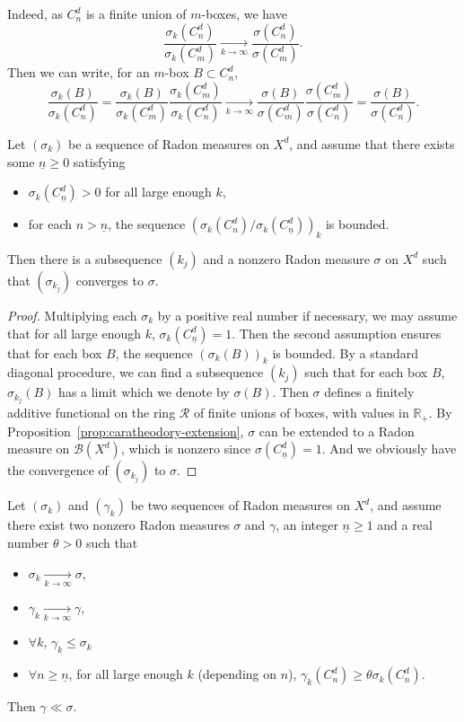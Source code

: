 \documentclass[10pt]{amsart}
\theoremstyle{definition}\newtheorem{defi}[theo]{Definition}\newtheorem{rema}[theo]{Remark}\newtheorem{exam}[theo]{Example}\newtheorem{exem}[theo]{Example}\newtheorem{nota}[theo]{Notation}
\newcommand{\tend}[3][]{\xrightarrow[#2\to#3]{#1}}
\newcommand{\RR}{\mathbb{R}}
\newcommand{\B}{\mathscr{B}}
\newcommand{\cd}{C^{d}}
\let\oldforall\forall
\renewcommand*{\forall}{\mathrel{\oldforall}}
\begin{document}
Indeed, as $\cd_n$ is a finite union of $m$-boxes, we have
\[
\frac{\sigma_k(\cd_n)}{\sigma_k(\cd_m)} \tend{k}{\infty}
\frac{\sigma(\cd_n)}{\sigma(\cd_m)}.
\]
Then we can write, for an $m$-box $B\subset\cd_n$,
\[
\frac{\sigma_k(B)}{\sigma_k(\cd_n)} = \frac{\sigma_k(B)}{\sigma_k(\cd_m)}
\frac{\sigma_k(\cd_m)}{\sigma_k(\cd_n)}
\tend{k}{\infty} \frac{\sigma(B)}{\sigma(\cd_m)}
\frac{\sigma(\cd_m)}{\sigma(\cd_n)} = \frac{\sigma(B)}{\sigma(\cd_n)}.
\]

\begin{prop}\label{prop:compacity}
Let $(\sigma_k)$ be a sequence of Radon measures on $X^d$, and assume that there exists some $\underline{n}\ge 0$ satisfying
\begin{itemize}
\item $\sigma_k(\cd_{\underline{n}})>0$ for all large enough $k$,
\item for each $n>\underline{n}$, the sequence $\left(\sigma_k(\cd_n)/\sigma_k(\cd_{\underline{n}})\right)_{k}$ is bounded.
\end{itemize}
Then there is a subsequence $(k_j)$ and a nonzero Radon measure $\sigma$ on $X^d$ such that $(\sigma_{k_j})$ converges to $\sigma$.
\end{prop}
\begin{proof}
Multiplying each $\sigma_k$ by a positive real number if necessary, we may assume that for all large enough $k$, $\sigma_k(\cd_{\underline{n}})=1$. Then the second assumption ensures that for each box $B$, the sequence $\left(\sigma_k(B)\right)_k$ is bounded. By a standard diagonal procedure, we can find a subsequence $(k_j)$ such that for each box $B$, $\sigma_{k_j}(B)$ has a limit which we denote by $\sigma(B)$. Then $\sigma$ defines a finitely additive functional on the ring $\mathscr{R}$ of finite unions of boxes, with values in $\RR_+$. By Proposition~\ref{prop:caratheodory-extension}, $\sigma$ can be extended to a Radon measure on $\B(X^d)$, which is nonzero since $\sigma(\cd_{\underline{n}})=1$. And we obviously have the convergence of $(\sigma_{k_j})$ to $\sigma$.
\end{proof}


\begin{prop}\label{prop:absolute_continuity}
Let $(\sigma_k)$ and $(\gamma_k)$ be two sequences of Radon measures on $X^d$, and assume there exist two nonzero Radon measures $\sigma$ and $\gamma$, an integer $\underline{n}\ge1$ and a real number $\theta>0$ such that
\begin{itemize}
\item $\sigma_k\tend{k}{\infty}\sigma$,
\item $\gamma_k\tend{k}{\infty}\gamma$,
\item $\forall k$, $\gamma_k\le\sigma_k$
\item $\forall n\ge \underline{n}$, for all large enough $k$ (depending on $n$), $\gamma_k(\cd_n)\ge \theta \sigma_k(\cd_n)$.
\end{itemize}
Then $\gamma\ll\sigma$.
\end{prop}
\end{document}
